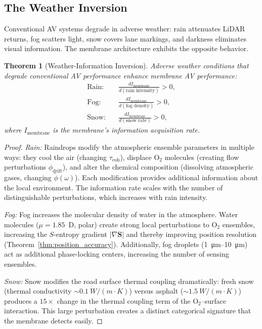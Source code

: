 \documentclass[12pt]{article}
\newtheorem{theorem}{Theorem}[section]
\theoremstyle{definition}
\theoremstyle{remark}
\begin{document}
\subsection{The Weather Inversion}

Conventional AV systems degrade in adverse weather: rain attenuates LiDAR returns, fog scatters light, snow covers lane markings, and darkness eliminates visual information. The membrane architecture exhibits the opposite behavior.

\begin{theorem}[Weather-Information Inversion]
\label{thm:weather_inversion}
Adverse weather conditions that degrade conventional AV performance enhance membrane AV performance:
\begin{align}
  \text{Rain:} &\quad \frac{dI_{\mathrm{membrane}}}{d(\text{rain intensity})} > 0, \label{eq:rain} \\
  \text{Fog:} &\quad \frac{dI_{\mathrm{membrane}}}{d(\text{fog density})} > 0, \label{eq:fog} \\
  \text{Snow:} &\quad \frac{dI_{\mathrm{membrane}}}{d(\text{snow rate})} > 0, \label{eq:snow}
\end{align}
where $I_{\mathrm{membrane}}$ is the membrane's information acquisition rate.
\end{theorem}

\begin{proof}
\emph{Rain:} Raindrops modify the atmospheric ensemble parameters in multiple ways: they cool the air (changing $\tau_{\mathrm{coh}}$), displace $\mathrm{O}_2$ molecules (creating flow perturbations $\phi_{\mathrm{drift}}$), and alter the chemical composition (dissolving atmospheric gases, changing $\tilde{\phi}(\omega)$). Each modification provides additional information about the local environment. The information rate scales with the number of distinguishable perturbations, which increases with rain intensity.

\emph{Fog:} Fog increases the molecular density of water in the atmosphere. Water molecules ($\mu = 1.85$~D, polar) create strong local perturbations to $\mathrm{O}_2$ ensembles, increasing the $S$-entropy gradient $|\nabla\mathbf{S}|$ and thereby improving position resolution (Theorem~\ref{thm:position_accuracy}). Additionally, fog droplets (\SI{1}{\micro m}--\SI{10}{\micro m}) act as additional phase-locking centers, increasing the number of sensing ensembles.

\emph{Snow:} Snow modifies the road surface thermal coupling dramatically: fresh snow (thermal conductivity $\sim \SI{0.1}{W/(m\cdot K)}$) versus asphalt ($\sim \SI{1.5}{W/(m\cdot K)}$) produces a $15\times$ change in the thermal coupling term of the $\mathrm{O}_2$--surface interaction. This large perturbation creates a distinct categorical signature that the membrane detects easily.
\end{proof}
\end{document}
